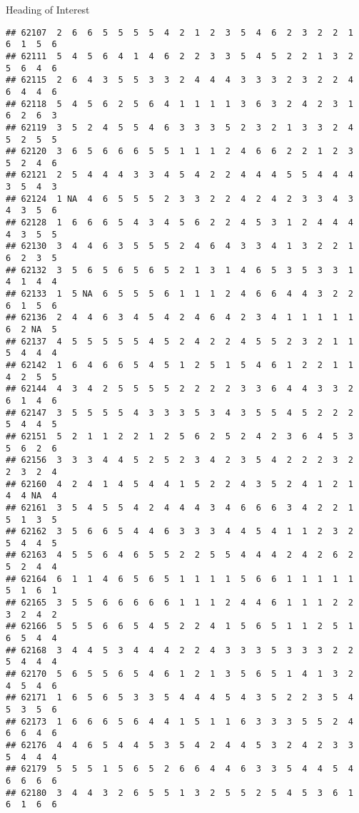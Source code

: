 \documentclass[
  ignorenonframetext,
]{beamer}
\begin{document}
\begin{frame}[fragile]{Heading of Interest}
\begin{verbatim}
## 62107  2  6  6  5  5  5  5  4  2  1  2  3  5  4  6  2  3  2  2  1  6  1  5  6
## 62111  5  4  5  6  4  1  4  6  2  2  3  3  5  4  5  2  2  1  3  2  5  6  4  6
## 62115  2  6  4  3  5  5  3  3  2  4  4  4  3  3  3  2  3  2  2  4  6  4  4  6
## 62118  5  4  5  6  2  5  6  4  1  1  1  1  3  6  3  2  4  2  3  1  6  2  6  3
## 62119  3  5  2  4  5  5  4  6  3  3  3  5  2  3  2  1  3  3  2  4  5  2  5  5
## 62120  3  6  5  6  6  6  5  5  1  1  1  2  4  6  6  2  2  1  2  3  5  2  4  6
## 62121  2  5  4  4  4  3  3  4  5  4  2  2  4  4  4  5  5  4  4  4  3  5  4  3
## 62124  1 NA  4  6  5  5  5  2  3  3  2  2  4  2  4  2  3  3  4  3  4  3  5  6
## 62128  1  6  6  6  5  4  3  4  5  6  2  2  4  5  3  1  2  4  4  4  4  3  5  5
## 62130  3  4  4  6  3  5  5  5  2  4  6  4  3  3  4  1  3  2  2  1  6  2  3  5
## 62132  3  5  6  5  6  5  6  5  2  1  3  1  4  6  5  3  5  3  3  1  4  1  4  4
## 62133  1  5 NA  6  5  5  5  6  1  1  1  2  4  6  6  4  4  3  2  2  6  1  5  6
## 62136  2  4  4  6  3  4  5  4  2  4  6  4  2  3  4  1  1  1  1  1  6  2 NA  5
## 62137  4  5  5  5  5  5  4  5  2  4  2  2  4  5  5  2  3  2  1  1  5  4  4  4
## 62142  1  6  4  6  6  5  4  5  1  2  5  1  5  4  6  1  2  2  1  1  4  2  5  5
## 62144  4  3  4  2  5  5  5  5  2  2  2  2  3  3  6  4  4  3  3  2  6  1  4  6
## 62147  3  5  5  5  5  4  3  3  3  5  3  4  3  5  5  4  5  2  2  2  5  4  4  5
## 62151  5  2  1  1  2  2  1  2  5  6  2  5  2  4  2  3  6  4  5  3  5  6  2  6
## 62156  3  3  3  4  4  5  2  5  2  3  4  2  3  5  4  2  2  2  3  2  2  3  2  4
## 62160  4  2  4  1  4  5  4  4  1  5  2  2  4  3  5  2  4  1  2  1  4  4 NA  4
## 62161  3  5  4  5  5  4  2  4  4  4  3  4  6  6  6  3  4  2  2  1  5  1  3  5
## 62162  3  5  6  6  5  4  4  6  3  3  3  4  4  5  4  1  1  2  3  2  5  4  4  5
## 62163  4  5  5  6  4  6  5  5  2  2  5  5  4  4  4  2  4  2  6  2  5  2  4  4
## 62164  6  1  1  4  6  5  6  5  1  1  1  1  5  6  6  1  1  1  1  1  5  1  6  1
## 62165  3  5  5  6  6  6  6  6  1  1  1  2  4  4  6  1  1  1  2  2  3  2  4  2
## 62166  5  5  5  6  6  5  4  5  2  2  4  1  5  6  5  1  1  2  5  1  6  5  4  4
## 62168  3  4  4  5  3  4  4  4  2  2  4  3  3  3  5  3  3  3  2  2  5  4  4  4
## 62170  5  6  5  5  6  5  4  6  1  2  1  3  5  6  5  1  4  1  3  2  4  5  4  6
## 62171  1  6  5  6  5  3  3  5  4  4  4  5  4  3  5  2  2  3  5  4  5  3  5  6
## 62173  1  6  6  6  5  6  4  4  1  5  1  1  6  3  3  3  5  5  2  4  6  6  4  6
## 62176  4  4  6  5  4  4  5  3  5  4  2  4  4  5  3  2  4  2  3  3  5  4  4  4
## 62179  5  5  5  1  5  6  5  2  6  6  4  4  6  3  3  5  4  4  5  4  6  6  6  6
## 62180  3  4  4  3  2  6  5  5  1  3  2  5  5  2  5  4  5  3  6  1  6  1  6  6

\end{verbatim}
\end{frame}
\end{document}
